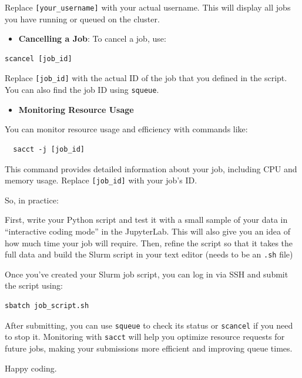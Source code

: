 \documentclass[
  letterpaper,
  DIV=11,
  numbers=noendperiod]{scrartcl}
\providecommand{\tightlist}{%
  \setlength{\itemsep}{0pt}\setlength{\parskip}{0pt}}\usepackage{longtable,booktabs,array}
\begin{document}
Replace \texttt{{[}your\_username{]}} with your actual username. This
will display all jobs you have running or queued on the cluster.

\begin{itemize}
\tightlist
\item
  \textbf{Cancelling a Job}: To cancel a job, use:
\end{itemize}

\begin{verbatim}
scancel [job_id]
\end{verbatim}

Replace \texttt{{[}job\_id{]}} with the actual ID of the job that you
defined in the script. You can also find the job ID using
\texttt{squeue}.

\begin{itemize}
\tightlist
\item
  \textbf{Monitoring Resource Usage}
\end{itemize}

You can monitor resource usage and efficiency with commands like:

\begin{verbatim}
  sacct -j [job_id]
\end{verbatim}

This command provides detailed information about your job, including CPU
and memory usage. Replace \texttt{{[}job\_id{]}} with your job's ID.

So, in practice:

First, write your Python script and test it with a small sample of your
data in ``interactive coding mode'' in the JupyterLab. This will also
give you an idea of how much time your job will require. Then, refine
the script so that it takes the full data and build the Slurm script in
your text editor (needs to be an \texttt{.sh} file)

Once you've created your Slurm job script, you can log in via SSH and
submit the script using:

\begin{verbatim}
sbatch job_script.sh
\end{verbatim}

After submitting, you can use \texttt{squeue} to check its status or
\texttt{scancel} if you need to stop it. Monitoring with \texttt{sacct}
will help you optimize resource requests for future jobs, making your
submissions more efficient and improving queue times.

Happy coding.
\end{document}

